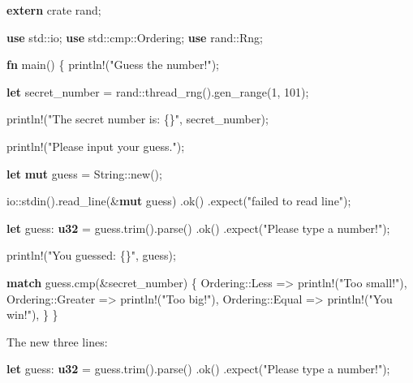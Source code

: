 \documentclass[a4paper,]{book}
\newenvironment{Shaded}{\begin{snugshade}}{\end{snugshade}}
\newcommand{\KeywordTok}[1]{\textcolor[rgb]{0.13,0.29,0.53}{\textbf{{#1}}}}
\newcommand{\DecValTok}[1]{\textcolor[rgb]{0.00,0.00,0.81}{{#1}}}
\newcommand{\StringTok}[1]{\textcolor[rgb]{0.31,0.60,0.02}{{#1}}}
\newcommand{\OtherTok}[1]{\textcolor[rgb]{0.56,0.35,0.01}{{#1}}}
\newcommand{\NormalTok}[1]{{#1}}
\begin{document}
\begin{Shaded}
\begin{Highlighting}[]
\KeywordTok{extern} \NormalTok{crate rand;}

\KeywordTok{use} \NormalTok{std::io;}
\KeywordTok{use} \NormalTok{std::cmp::Ordering;}
\KeywordTok{use} \NormalTok{rand::Rng;}

\KeywordTok{fn} \NormalTok{main() \{}
    \OtherTok{println!}\NormalTok{(}\StringTok{"Guess the number!"}\NormalTok{);}

    \KeywordTok{let} \NormalTok{secret_number = rand::thread_rng().gen_range(}\DecValTok{1}\NormalTok{, }\DecValTok{101}\NormalTok{);}

    \OtherTok{println!}\NormalTok{(}\StringTok{"The secret number is: \{\}"}\NormalTok{, secret_number);}

    \OtherTok{println!}\NormalTok{(}\StringTok{"Please input your guess."}\NormalTok{);}

    \KeywordTok{let} \KeywordTok{mut} \NormalTok{guess = String::new();}

    \NormalTok{io::stdin().read_line(&}\KeywordTok{mut} \NormalTok{guess)}
        \NormalTok{.ok()}
        \NormalTok{.expect(}\StringTok{"failed to read line"}\NormalTok{);}

    \KeywordTok{let} \NormalTok{guess: }\KeywordTok{u32} \NormalTok{= guess.trim().parse()}
        \NormalTok{.ok()}
        \NormalTok{.expect(}\StringTok{"Please type a number!"}\NormalTok{);}

    \OtherTok{println!}\NormalTok{(}\StringTok{"You guessed: \{\}"}\NormalTok{, guess);}

    \KeywordTok{match} \NormalTok{guess.cmp(&secret_number) \{}
        \NormalTok{Ordering::Less    => }\OtherTok{println!}\NormalTok{(}\StringTok{"Too small!"}\NormalTok{),}
        \NormalTok{Ordering::Greater => }\OtherTok{println!}\NormalTok{(}\StringTok{"Too big!"}\NormalTok{),}
        \NormalTok{Ordering::Equal   => }\OtherTok{println!}\NormalTok{(}\StringTok{"You win!"}\NormalTok{),}
    \NormalTok{\}}
\NormalTok{\}}
\end{Highlighting}
\end{Shaded}

The new three lines:

\begin{Shaded}
\begin{Highlighting}[]
    \KeywordTok{let} \NormalTok{guess: }\KeywordTok{u32} \NormalTok{= guess.trim().parse()}
        \NormalTok{.ok()}
        \NormalTok{.expect(}\StringTok{"Please type a number!"}\NormalTok{);}
\end{Highlighting}
\end{Shaded}
\end{document}
